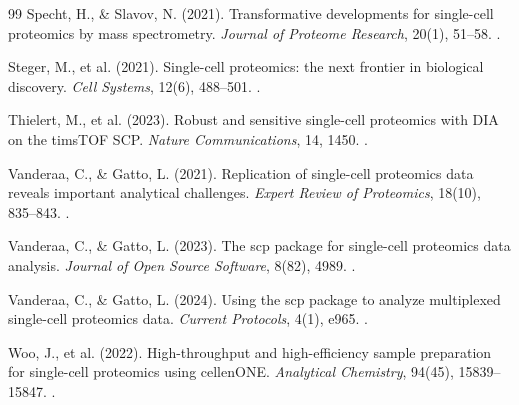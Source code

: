 \documentclass[11pt,twoside,openright]{book}
\begin{document}
\begin{thebibliography}{99}
Specht, H., \& Slavov, N. (2021). Transformative developments for single-cell proteomics by mass spectrometry. \textit{Journal of Proteome Research}, 20(1), 51--58. .

Steger, M., et al. (2021). Single-cell proteomics: the next frontier in biological discovery. \textit{Cell Systems}, 12(6), 488--501. .

Thielert, M., et al. (2023). Robust and sensitive single-cell proteomics with DIA on the timsTOF SCP. \textit{Nature Communications}, 14, 1450. .

Vanderaa, C., \& Gatto, L. (2021). Replication of single-cell proteomics data reveals important analytical challenges. \textit{Expert Review of Proteomics}, 18(10), 835--843. .

Vanderaa, C., \& Gatto, L. (2023). The scp package for single-cell proteomics data analysis. \textit{Journal of Open Source Software}, 8(82), 4989. .

Vanderaa, C., \& Gatto, L. (2024). Using the scp package to analyze multiplexed single-cell proteomics data. \textit{Current Protocols}, 4(1), e965. .

Woo, J., et al. (2022). High-throughput and high-efficiency sample preparation for single-cell proteomics using cellenONE. \textit{Analytical Chemistry}, 94(45), 15839--15847. .

\end{thebibliography}
\end{document}
